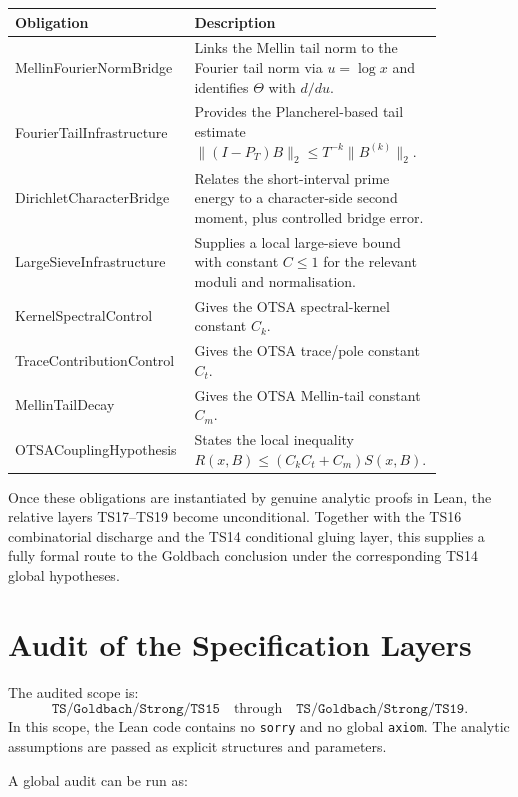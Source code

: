 \documentclass[11pt]{article}
\newcommand{\code}[1]{\texttt{#1}}
\newcommand{\oblig}[1]{\textsf{#1}}
\begin{document}
\begin{center}
\small
\begin{longtable}{p{0.30\linewidth}p{0.55\linewidth}}
\toprule
Obligation & Description \\
\midrule
\oblig{MellinFourierNormBridge} &
Links the Mellin tail norm to the Fourier tail norm via \(u=\log x\) and
identifies \(\Theta\) with \(d/du\). \\
\oblig{FourierTailInfrastructure} &
Provides the Plancherel-based tail estimate
\(\|(I-P_T)B\|_2 \le T^{-k}\|B^{(k)}\|_2\). \\
\oblig{DirichletCharacterBridge} &
Relates the short-interval prime energy to a character-side second moment,
plus controlled bridge error. \\
\oblig{LargeSieveInfrastructure} &
Supplies a local large-sieve bound with constant \(C\le 1\) for the relevant
moduli and normalisation. \\
\oblig{KernelSpectralControl} &
Gives the OTSA spectral-kernel constant \(C_k\). \\
\oblig{TraceContributionControl} &
Gives the OTSA trace/pole constant \(C_t\). \\
\oblig{MellinTailDecay} &
Gives the OTSA Mellin-tail constant \(C_m\). \\
\oblig{OTSACouplingHypothesis} &
States the local inequality \(R(x,B)\le (C_kC_t+C_m)S(x,B)\). \\
\bottomrule
\end{longtable}
\end{center}

Once these obligations are instantiated by genuine analytic proofs in Lean, the
relative layers TS17--TS19 become unconditional. Together with the TS16
combinatorial discharge and the TS14 conditional gluing layer, this supplies a
fully formal route to the Goldbach conclusion under the corresponding TS14
global hypotheses.

\section{Audit of the Specification Layers}

The audited scope is:
\[
  \code{TS/Goldbach/Strong/TS15}
  \quad\text{through}\quad
  \code{TS/Goldbach/Strong/TS19}.
\]
In this scope, the Lean code contains no \code{sorry} and no global
\code{axiom}. The analytic assumptions are passed as explicit structures and
parameters.

A global audit can be run as:
\end{document}
